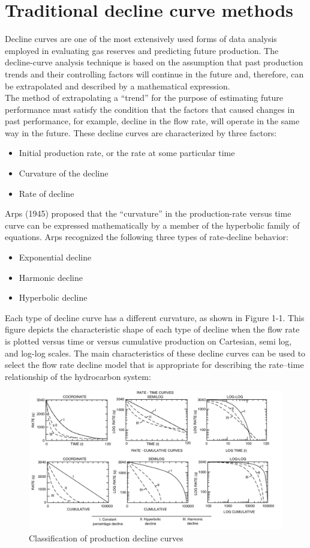 \documentclass[12pt,a4paper]{report}
\begin{document}
\section{Traditional decline curve methods\cite{Tarek}}
Decline curves are one of the most extensively used forms of data analysis employed in evaluating gas reserves and predicting future production. The decline-curve analysis technique is based on the assumption that past production trends and their controlling factors will continue in the future and, therefore, can be extrapolated and described by a mathematical expression.\\
The method of extrapolating a “trend” for the purpose of estimating future performance must satisfy the condition that the factors that caused changes in past performance, for example, decline in the flow rate, will operate in the same way in the future. These decline curves are characterized by three factors:
\begin{itemize}
	\item Initial production rate, or the rate at some particular time
	\item Curvature of the decline
	\item Rate of decline
\end{itemize}
Arps (1945) proposed that the “curvature” in the production-rate versus time curve can be expressed mathematically by a member of the hyperbolic family of equations. Arps recognized the following three types of rate-decline behavior:
\begin{itemize}
	\item Exponential decline
	\item Harmonic decline
	\item Hyperbolic decline
\end{itemize}
Each type of decline curve has a different curvature, as shown in Figure 1-1. This figure depicts the characteristic shape of each type of decline when the flow rate is plotted versus time or versus cumulative production on Cartesian, semi log, and log-log scales. The main characteristics of these decline curves can be used to select the flow rate decline model that is appropriate for describing the rate–time relationship of the hydrocarbon system:
\begin{figure}[H]
\centering
\includegraphics[scale = 0.6]{Fig_theo/decline}
\caption{Classification of production decline curves}
\end{figure}
\end{document}
